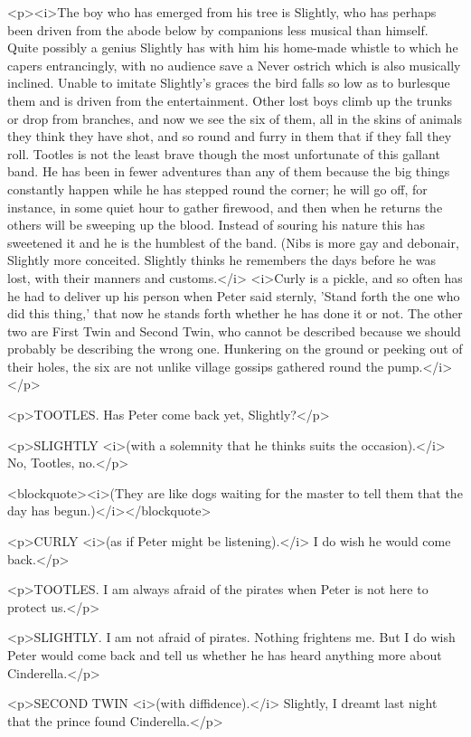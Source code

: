 <p><i>The boy who has emerged from his tree is Slightly, who has
perhaps been driven from the abode below by companions less musical
than himself. Quite possibly a genius Slightly has with him his
home-made whistle to which he capers entrancingly, with no audience
save a Never ostrich which is also musically inclined. Unable to
imitate Slightly's graces the bird falls so low as to burlesque them
and is driven from the entertainment. Other lost boys climb up the
trunks or drop from branches, and now we see the six of them, all in
the skins of animals they think they have shot, and so round and
furry in them that if they fall they roll. Tootles is not the least
brave though the most unfortunate of this gallant band. He has been
in fewer adventures than any of them because the big things
constantly happen while he has stepped round the corner; he will go
off, for instance, in some quiet hour to gather firewood, and then
when he returns the others will be sweeping up the blood. Instead of
souring his nature this has sweetened it and he is the humblest of
the band. (Nibs is more gay and debonair, Slightly more conceited.
Slightly thinks he remembers the days before he was lost, with their
manners and customs.</i> <i>Curly is a pickle, and so often has he
had to deliver up his person when Peter said sternly, 'Stand forth
the one who did this thing,' that now he stands forth whether he has
done it or not. The other two are First Twin and Second Twin, who
cannot be described because we should probably be describing the
wrong one. Hunkering on the ground or peeking out of their holes, the
six are not unlike village gossips gathered round the pump.</i></p>

<p>TOOTLES. Has Peter come back yet, Slightly?</p>

<p>SLIGHTLY <i>(with a solemnity that he thinks suits the
occasion).</i> No, Tootles, no.</p>

<blockquote><i>(They are like dogs waiting for the master to tell
them that the day has begun.)</i></blockquote>

<p>CURLY <i>(as if Peter might be listening).</i> I do wish he would
come back.</p>

<p>TOOTLES. I am always afraid of the pirates when Peter is not here
to protect us.</p>

<p>SLIGHTLY. I am not afraid of pirates. Nothing frightens me. But I
do wish Peter would come back and tell us whether he has heard
anything more about Cinderella.</p>

<p>SECOND TWIN <i>(with diffidence).</i> Slightly, I dreamt last
night that the prince found Cinderella.</p>

